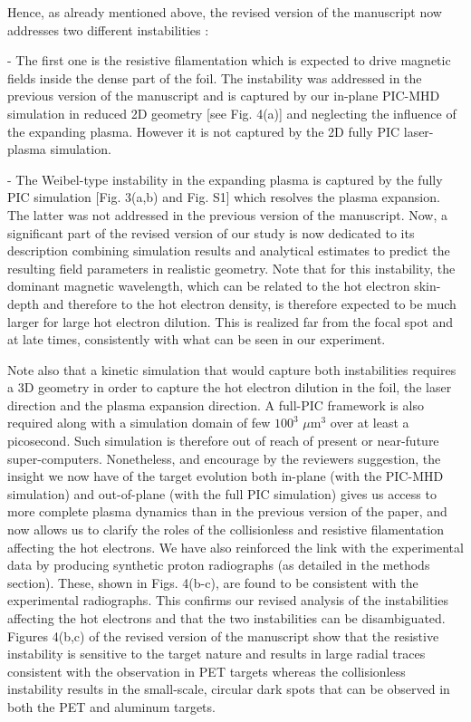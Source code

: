 \documentclass{article}
\begin{document}
\begin{enumerate}
Hence, as already mentioned above, the revised version of the manuscript now addresses two different instabilities :

- The first one is the resistive filamentation which is expected to drive magnetic fields inside the dense part of the foil. The instability was addressed in the previous version of the manuscript and is captured by our in-plane PIC-MHD simulation in reduced 2D geometry [see Fig. 4(a)] and neglecting the influence of the expanding plasma. However it is not captured by the 2D fully PIC laser-plasma simulation.

- The Weibel-type instability    in the expanding plasma is    captured by the fully PIC simulation [Fig. 3(a,b) and Fig. S1]  which resolves the plasma expansion.
 The latter was not addressed in the previous version of the manuscript. Now, a significant part of the revised version of our study is now dedicated to its description combining simulation results and analytical estimates to predict the resulting field parameters in realistic geometry.
Note that for this instability,  the dominant magnetic wavelength, which can  be related to the hot electron skin-depth and therefore to the hot electron density, is therefore expected to be much larger for large hot electron dilution. 
This is realized far from the focal spot and at late times, consistently with what can be seen in our experiment.

Note also that a kinetic simulation that would capture both instabilities requires a 3D geometry in order to capture the hot electron dilution in the foil, the laser direction and the plasma expansion direction.  A full-PIC framework is also required along with a simulation domain of  few   $100^3$ $\mu$m$^3$   over at least a picosecond. Such simulation is therefore out of reach of present or near-future super-computers.
Nonetheless, and encourage by the reviewers suggestion, the insight we now have of the target evolution both in-plane (with the PIC-MHD simulation) and out-of-plane (with the full PIC simulation) gives us access to more complete plasma dynamics than in the previous version of the paper, and now allows us to clarify the roles of the collisionless and resistive filamentation affecting the hot electrons.
We have also reinforced the link with the experimental data by producing synthetic proton radiographs (as detailed in the methods section). These, shown in Figs. 4(b-c), are found to be consistent with the experimental radiographs. This confirms  our revised analysis of the instabilities affecting the hot electrons and that the two instabilities can be disambiguated.  Figures 4(b,c) of  the revised version of the manuscript show that the resistive instability is sensitive to the target nature and results in large radial traces consistent with the observation in PET targets whereas  the collisionless instability  results in the small-scale, circular dark spots  that can be observed in both the PET and aluminum targets.

\end{enumerate}
\end{document}

